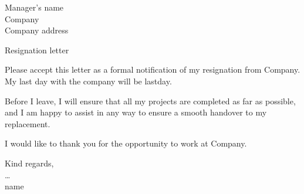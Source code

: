 \documentclass[a4paper]{letter}
\def\Name{name}
\def\ManagerName{Manager's name}
\def\CompanyName{Company}
\def\CompanyAddress{Company address}
\def\CompanyDetails{\ManagerName \\ \CompanyName \\ \CompanyAddress}
\def\LastDay{lastday}
\begin{document}
\begin{letter}{\CompanyDetails}
{
    \opening{\noindent Resignation letter}{}
        Please accept this letter as a formal notification of my resignation from \CompanyName{}. My last day with the company will be \LastDay{}. %

        Before I leave, I will ensure that all my projects are completed as far as possible, and I am happy to assist in any way to ensure a smooth handover to my replacement.

        I would like to thank you for the opportunity to work at \CompanyName{}.
    \closing{Kind regards, \\ \ldots \\ \Name}
}
\end{letter}
\end{document}
